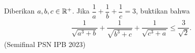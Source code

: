Diberikan $a,b,c \in \mathbb R^+$. Jika $\dfrac{1}{a}+\dfrac{1}{b}+\dfrac{1}{c}=3$, buktikan bahwa
\begin{align*}
    \dfrac{1}{\sqrt{a^3+b}}+\dfrac{1}{\sqrt{b^3+c}}+\dfrac{1}{\sqrt{c^3+a}} \le \dfrac{3}{\sqrt{2}}.
\end{align*}
(Semifinal PSN IPB 2023)